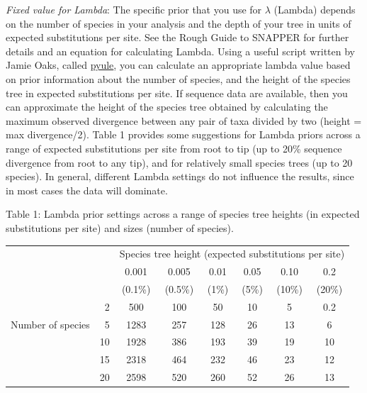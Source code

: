{    
\textit{Fixed value for Lambda}: The specific prior that you use for {$\lambda$} (Lambda) depends on the number of species in your analysis and the depth of your tree in units of expected substitutions per site. See the Rough Guide to SNAPPER for further details and an equation for calculating Lambda. Using a useful script written by Jamie Oaks, called \href{https://github.com/joaks1/pyule}{pyule}, you can calculate an appropriate lambda value based on prior information about the number of species, and the height of the species tree in expected substitutions per site. If sequence data are available, then you can approximate the height of the species tree obtained by calculating the maximum observed divergence between any pair of taxa divided by two (height = max divergence/2). 
   \newpage
Table 1 provides some suggestions for Lambda priors across a range of expected substitutions per site from root to tip (up to 20\% sequence divergence from root to any tip), and for relatively small species trees (up to 20 species). In general, different Lambda settings do not influence the results, since in most cases the data will dominate. 

Table 1: Lambda prior settings across a range of species tree heights (in expected substitutions per site) and sizes (number of species).
\begin{table}[ht]
\tabcolsep=0.4cm
\begin{tabular}{rrcccccc}
\hline
        &    & \multicolumn{6}{c}{Species tree height (expected substitutions per site)}     \\
        				&    	& 0.001 	& 0.005 	& 0.01 	& 0.05  	& 0.10 	&0.2\\
        				&    	&  (0.1\%)	&  (0.5\%) &  (1\%) 	&  (5\%)  	& (10\%)  	& (20\%)\\ \hline
        				& 2 	& 500	& 100 	& 50 		& 10 		& 5 		& 0.2\\
Number of species 	& 5	& 1283 	& 257 	& 128 	& 26 		& 13 		& 6\\
        				& 10	& 1928 	& 386 	& 193 	& 39 		& 19 		& 10\\
        				& 15	&  2318	&  464	&  232	& 46		& 23		& 12\\
        				& 20	&  2598	&  520	&  260	& 52 		& 26 		& 13\\\hline
\end{tabular}
\end{table}
    
}
